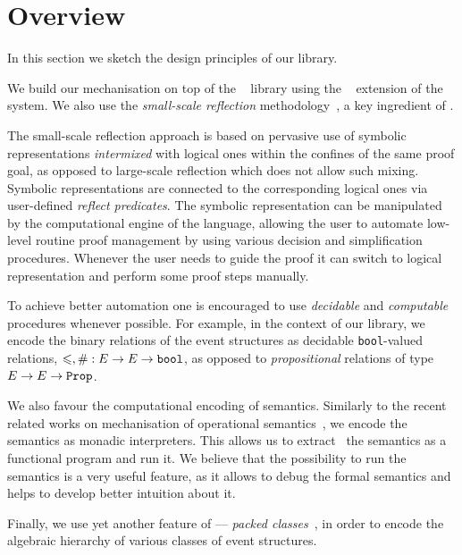 \section{Overview}

In this section we sketch the design principles of our library. 

We build our mechanisation on top of the \mathcomp~\cite{Mahboubi-Tassi:MATHCOMP17} library 
using the \ssreflect~\cite{Gonthier-al:SSR2016} extension of the \coq system.
We also use the \emph{small-scale reflection} 
methodology~\cite{Gonthier-Assia:SSR2010, Gonthier-al:SSR2016}, 
a key ingredient of \ssreflect. 

The small-scale reflection approach is based on 
pervasive use of symbolic representations \emph{intermixed}
with logical ones within the confines of the same proof goal,
as opposed to large-scale reflection which does not allow such mixing.
Symbolic representations are connected to the corresponding logical ones
via user-defined \emph{reflect predicates}.
The symbolic representation can be manipulated 
by the computational engine of the language, 
allowing the user to automate low-level routine 
proof management by using various decision 
and simplification procedures.
Whenever the user needs to guide the proof 
it can switch to logical representation
and perform some proof steps manually. 

To achieve better automation one is encouraged 
to use \emph{decidable} and \emph{computable} procedures
whenever possible.
For example, in the context of our library, 
we encode the binary relations of the event structures
as decidable \texttt{bool}-valued relations, 
\ie $\leqslant, \# : E \rightarrow E \rightarrow \texttt{bool}$,
as opposed to \emph{propositional} 
relations of type $E \rightarrow E \rightarrow \texttt{Prop}$. 

We also favour the computational encoding of semantics. 
Similarly to the recent related works on mechanisation 
of operational semantics~\cite{Xia-al:POPL2019, Letan-al:CPP2020, Affeldt-al:ICMPC2019}, 
we encode the semantics as monadic interpreters.  
This allows us to extract~\cite{Letouzey:CCE2008} 
the semantics as a functional program and run it. 
We believe that the possibility to run the semantics 
is a very useful feature, as it allows 
to debug the formal semantics
and helps to develop better intuition about it.

Finally, we use yet another feature of \mathcomp --- 
\emph{packed classes}~\cite{Garillot-al:ICTPHOL2009}, 
in order to encode the algebraic hierarchy
of various classes of event structures. 
